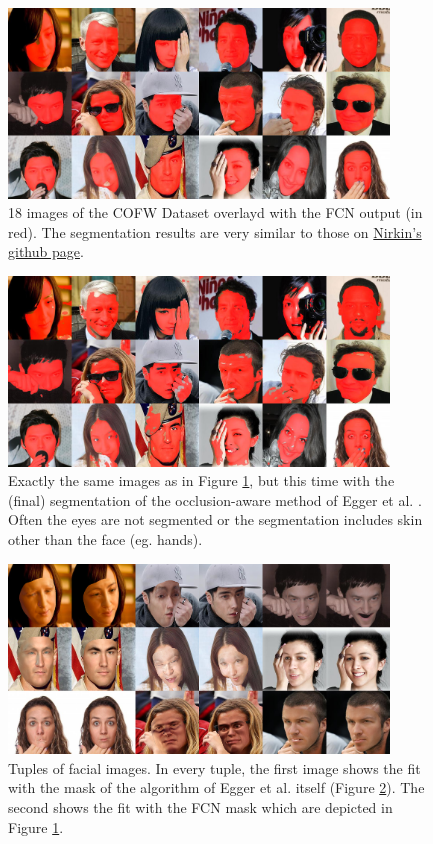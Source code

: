 \begin{figure}[h]
	\centering
	\includegraphics[width=0.9\textwidth]{Figures/chap2/myMatrix.jpg}
	\caption{18 images of the COFW Dataset overlayd with the FCN output (in red). The segmentation results are very similar to those on \href{https://github.com/YuvalNirkin/face_segmentation}{Nirkin's github page}.}
	\label{fig:chap2:myMatrix}
\end{figure}

\begin{figure}[h]
	\centering
	\includegraphics[width=0.9\textwidth]{Figures/chap2/myMatrix_EGGER.jpg}
	\caption{Exactly the same images as in Figure \ref{fig:chap2:myMatrix}, but this time with the (final) segmentation of the occlusion-aware method of Egger et al. \cite{egger_paper}. Often the eyes are not segmented or the segmentation includes skin other than the face (eg. hands).}
	\label{fig:chap2:myMatrix_EGGER}
\end{figure}

\begin{figure}[h]
	\centering
	\includegraphics[width=0.9\textwidth]{Figures/chap2/COFW_Fits.png}
	\caption{Tuples of facial images. In every tuple, the first image shows the fit with the mask of the algorithm of Egger et al. itself (Figure \ref{fig:chap2:myMatrix_EGGER}). The second shows the fit with the FCN mask which are depicted in Figure \ref{fig:chap2:myMatrix}.}
	\label{fig:chap2:COFW_Fits}
\end{figure}


